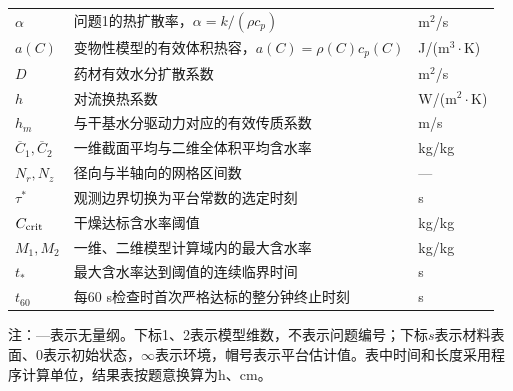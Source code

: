 \begin{longtable}{>{\raggedright\arraybackslash}p{2.8cm}>{\raggedright\arraybackslash}p{8.3cm}>{\raggedright\arraybackslash}p{3.1cm}}
$\alpha$ & 问题1的热扩散率，$\alpha=k/(\rho c_p)$ & m$^2$/s\\
$a(C)$ & 变物性模型的有效体积热容，$a(C)=\rho(C)c_p(C)$ & J/(m$^3\cdot$K)\\
$D$ & 药材有效水分扩散系数 & m$^2$/s\\
$h$ & 对流换热系数 & W/(m$^2\cdot$K)\\
$h_m$ & 与干基水分驱动力对应的有效传质系数 & m/s\\
$\overline C_1,\overline C_2$ & 一维截面平均与二维全体积平均含水率 & kg/kg\\
$N_r,N_z$ & 径向与半轴向的网格区间数 & ---\\
$\tau^*$ & 观测边界切换为平台常数的选定时刻 & s\\
$C_{\rm crit}$ & 干燥达标含水率阈值 & kg/kg\\
$M_1,M_2$ & 一维、二维模型计算域内的最大含水率 & kg/kg\\
$t_*$ & 最大含水率达到阈值的连续临界时间 & s\\
$t_{60}$ & 每60 s检查时首次严格达标的整分钟终止时刻 & s\\
\end{longtable}
\endgroup
\noindent\small 注：---表示无量纲。下标1、2表示模型维数，不表示问题编号；下标$s$表示材料表面、$0$表示初始状态，$\infty$表示环境，帽号表示平台估计值。表中时间和长度采用程序计算单位，结果表按题意换算为h、cm。\par\normalsize
